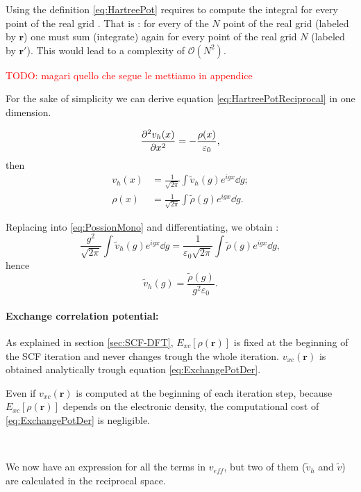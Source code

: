 \documentclass[a4paper,12pt]{article}
\newcommand\mynotes[1]{\begin{flushright}

\textcolor{red}{TODO: #1}\end{flushright}}
\newcommand\mf[1]{\mathbf{#1}}
\newcommand\dens{\rho(\mathbf{r})}
\newcommand\erre{\mathbf{r}}
\begin{document}
Using the definition \eqref{eq:HartreePot} requires to compute the integral for every point of the real grid . That is : for every of the $N$ point of the real grid (labeled by $\mf{r}$) one must sum (integrate) again for every point of the real grid $N$ (labeled by $\mf{r}'$). 
This would lead to a complexity of $\mathcal{O}(N^2)$.

\mynotes{magari quello che segue le mettiamo in appendice}
For the sake of simplicity we can derive equation \eqref{eq:HartreePotReciprocal} in one dimension.

\begin{equation} \label{eq:PossionMono}
	\pdv[2]{v_{h}(x)}{x} = - \frac{\rho(x)}{\varepsilon_0},
\end{equation}
then 
\begin{align*}
	v_{h}(x) &= \frac{1}{\sqrt{2\pi}} \int \tilde{v}_{h}(g) e^{i g x} \dd{g}; \\
	\rho(x) &= \frac{1}{\sqrt{2\pi}} \int \tilde{\rho}(g) e^{i g x} \dd{g}.
\end{align*}

Replacing into  \eqref{eq:PossionMono} and differentiating, we obtain :
\begin{equation}
	\frac{g^2}{\sqrt{2\pi}} \int \tilde{v}_{h}(g) e^{i g x} \dd{g} = \frac{1}{\varepsilon_{0}\sqrt{2\pi}} \int \tilde{\rho}(g) e^{i g x} \dd{g},
\end{equation}
hence 
\begin{equation}
	\tilde{v}_{h}(g) = \frac{\tilde{\rho}(g)}{g^2 \varepsilon_{0}}.
\end{equation}



\paragraph{Exchange correlation potential:} 
As explained in section \ref{sec:SCF-DFT}, $E_{xc}[\dens]$ is fixed at the beginning of the SCF iteration and never changes trough the whole iteration. $v_{xc}(\erre)$ is obtained analytically trough equation \eqref{eq:ExchangePotDer}.

Even if $v_{xc}(\erre)$ is computed at the beginning of each iteration step, because $E_{xc}[\dens]$ depends on the electronic density, the computational cost of \eqref{eq:ExchangePotDer} is negligible.


~


We now have an expression for all the terms in $v_{eff}$, but two of them ($\tilde{v}_{h}$ and $\tilde{v}$) are calculated in the reciprocal space.
\end{document}
